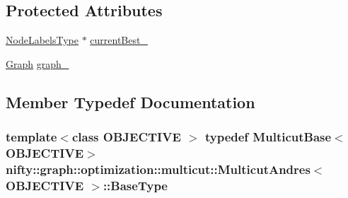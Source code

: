 \subsection*{Protected Attributes}
\begin{DoxyCompactItemize}
\item 
\hyperlink{classnifty_1_1graph_1_1optimization_1_1multicut_1_1MulticutAndres_aebe9bae6ca2760f72e19ec62504de209}{Node\+Labels\+Type} $\ast$ \hyperlink{classnifty_1_1graph_1_1optimization_1_1multicut_1_1MulticutAndres_ac5ff8ecc2f1b750d063b1deee34db9be}{current\+Best\+\_\+}
\item 
\hyperlink{classnifty_1_1graph_1_1optimization_1_1multicut_1_1MulticutAndres_a975ce8ae05d1ef2a988656c5906616bb}{Graph} \hyperlink{classnifty_1_1graph_1_1optimization_1_1multicut_1_1MulticutAndres_a80f20b9e88a4d6460729ca5b16bd2a0a}{graph\+\_\+}
\end{DoxyCompactItemize}


\subsection{Member Typedef Documentation}
\hypertarget{classnifty_1_1graph_1_1optimization_1_1multicut_1_1MulticutAndres_a075b7a01930fbfb2fa2834157c78bf89}{}
\subsubsection[{Base\+Type}]{\setlength{\rightskip}{0pt plus 5cm}template$<$class O\+B\+J\+E\+C\+T\+I\+V\+E $>$ typedef {\bf Multicut\+Base}$<$O\+B\+J\+E\+C\+T\+I\+V\+E$>$ {\bf nifty\+::graph\+::optimization\+::multicut\+::\+Multicut\+Andres}$<$ O\+B\+J\+E\+C\+T\+I\+V\+E $>$\+::{\bf Base\+Type}}\label{classnifty_1_1graph_1_1optimization_1_1multicut_1_1MulticutAndres_a075b7a01930fbfb2fa2834157c78bf89}
\hypertarget{classnifty_1_1graph_1_1optimization_1_1multicut_1_1MulticutAndres_a975ce8ae05d1ef2a988656c5906616bb}{}
